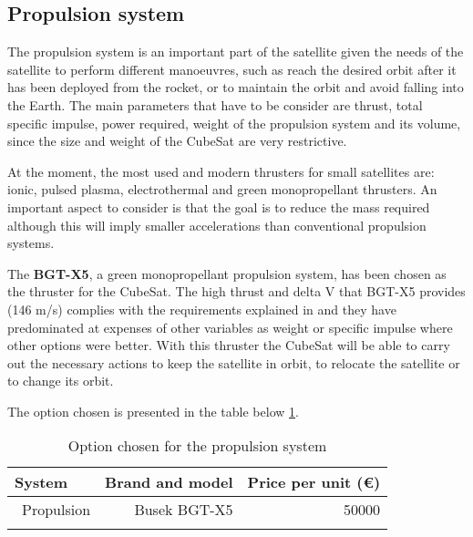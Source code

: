 \subsection{Propulsion system}
\label{ch:PropulsionSystems}
The propulsion system is an important part of the satellite given the needs of the satellite to perform different manoeuvres, such as reach the desired orbit after it has been deployed from the rocket, or to maintain the orbit and avoid falling into the Earth. The main parameters that have to be consider are thrust, total specific impulse, power required, weight of the propulsion system and its volume, since the size and weight of the CubeSat are very restrictive. \cite[Chapter 1, Section 3]{annex4}

At the moment, the most used and modern thrusters for small satellites are: ionic, pulsed plasma, electrothermal and green monopropellant thrusters. An important aspect to consider is that the goal is to reduce the mass required although this will imply smaller accelerations than conventional propulsion systems.

The \textbf{BGT-X5}, a green monopropellant propulsion system, has been chosen as the thruster for the CubeSat. The high thrust and delta V that BGT-X5 provides (146 m/s) complies with the requirements explained in \cite[Chapter 1, Section 4]{annex2} and they have predominated at expenses of other variables as weight or specific impulse where other options were better. With this thruster the CubeSat will be able to carry out the necessary actions to keep the satellite in orbit, to relocate the satellite or to change its orbit. \cite[Chapter 1, Section 3]{annex4}

The option chosen is presented in the table below \ref{propulsionfinal}.

\begin{longtable}{| l | r | r | }
\hline
\rowcolor[gray]{0.80}	\textbf{System} &  \textbf{Brand and model}     & \textbf{Price per unit (\euro)}   \\
\hline
\endfirsthead

	   ~Propulsion & Busek BGT-X5 & 50000 \\
	\hline

\caption{Option chosen for the propulsion system}
\label{propulsionfinal}
\end{longtable}